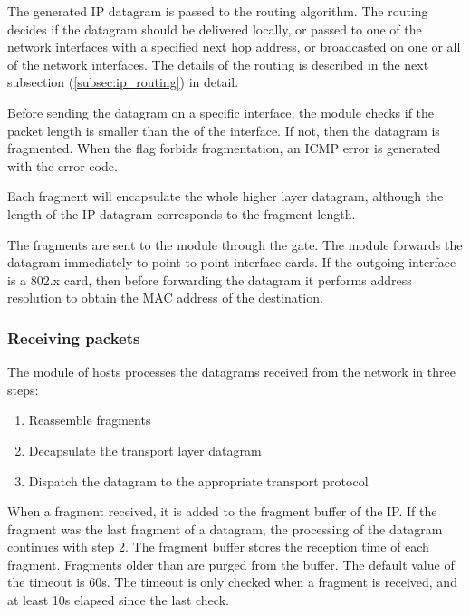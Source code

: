 The generated IP datagram is passed to the routing algorithm. The routing decides if the
datagram should be delivered locally, or passed to one of the network interfaces
with a specified next hop address, or broadcasted on one or all of the network interfaces.
The details of the routing is described in the next subsection (\ref{subsec:ip_routing})
in detail.

Before sending the datagram on a specific interface, the  module
checks if the packet length is smaller than the  of the interface.
If not, then the datagram is fragmented. When the  flag
forbids fragmentation, an  ICMP error is generated
with the  error code.
\begin{note}
Each fragment will encapsulate the whole higher layer datagram, although the
length of the IP datagram corresponds to the fragment length.
\end{note}

The fragments are sent to the  module through the  gate.
The  module forwards the datagram immediately to point-to-point interface
cards. If the outgoing interface is a 802.x card, then before forwarding the datagram
it performs address resolution to obtain the MAC address of the destination.

\subsubsection*{Receiving packets}

The  module of hosts processes the datagrams received from the network
in three steps:
\begin{enumerate}
  \item Reassemble fragments
  \item Decapsulate the transport layer datagram
  \item Dispatch the datagram to the appropriate transport protocol
\end{enumerate}

When a fragment received, it is added to the fragment buffer of the IP.
If the fragment was the last fragment of a datagram, the processing of
the datagram continues with step 2. The fragment buffer stores the reception
time of each fragment. Fragments older than  are
purged from the buffer. The default value of the timeout is 60s. The
timeout is only checked when a fragment is received, and at least 10s
elapsed since the last check.

